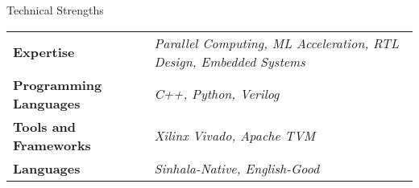 \documentclass[
	11pt, %
]{./../assets/resume} %
\begin{document}
	




\begin{rSection}{Technical Strengths}

	\def\arraystretch{1.5}

	\begin{tabular}{ l l}
		\textbf{Expertise} & \emph{Parallel Computing, ML Acceleration, RTL Design, Embedded Systems} \\
		\textbf{Programming Languages} & \emph{C++, Python, Verilog} \\
		\textbf{Tools and Frameworks} & \emph{Xilinx Vivado, Apache TVM} \\ 
		\textbf{Languages} & \emph{Sinhala-Native, English-Good} \\
	\end{tabular}

\end{rSection}

\end{document}
